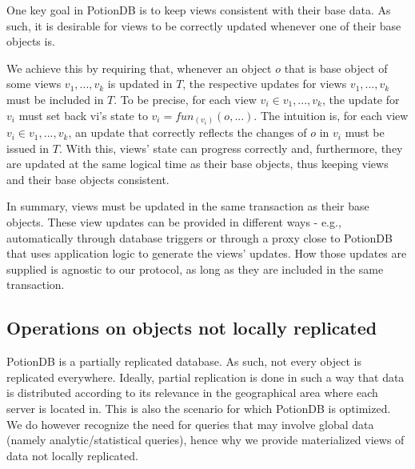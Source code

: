 \documentclass{vldb}
\begin{document}
One key goal in PotionDB is to keep views consistent with their base data.
As such, it is desirable for views to be correctly updated whenever one of their base objects is.

We achieve this by requiring that, whenever an object $o$ that is base object of some views $v_1, ..., v_k$ is updated in $T$, the respective updates for views $v_1, ..., v_k$ must be included in $T$.
To be precise, for each view $v_i \in v_1, ..., v_k$, the update for $v_i$ must set back vi’s state to $v_i = fun_{(v_i)}(o, ...)$.
The intuition is, for each view $v_i \in v_1, ..., v_k$, an update that correctly reflects the changes of $o$ in $v_i$ must be issued in $T$.
With this, views' state can progress correctly and, furthermore, they are updated at the same logical time as their base objects, thus keeping views and their base objects consistent.

In summary, views must be updated in the same transaction as their base objects.
These view updates can be provided in different ways - e.g., automatically through database triggers \cite{oracleTriggers, dbtoaster} or through a proxy close to PotionDB that uses application logic to generate the views' updates.
How those updates are supplied is agnostic to our protocol, as long as they are included in the same transaction.

\subsection{Operations on objects not locally replicated}
\label{subsec:operationsNonLocal}

PotionDB is a partially replicated database.
As such, not every object is replicated everywhere.
Ideally, partial replication is done in such a way that data is distributed according to its relevance in the geographical area where each server is located in.
This is also the scenario for which PotionDB is optimized.
We do however recognize the need for queries that may involve global data (namely analytic/statistical queries), hence why we provide materialized views of data not locally replicated.
\end{document}
